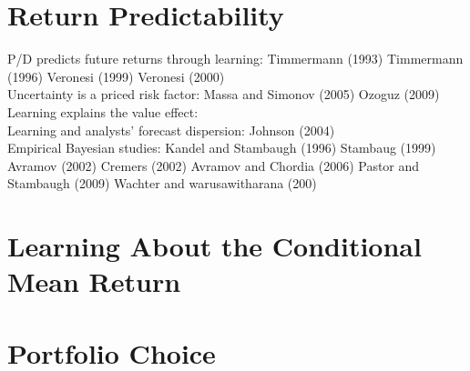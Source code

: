 \documentclass{article}
\begin{document}
\section{Return Predictability}
P/D predicts future returns through learning:
Timmermann (1993)
Timmermann (1996)
Veronesi (1999)
Veronesi (2000)
\\

Uncertainty is a priced risk factor:
Massa and Simonov (2005)
Ozoguz (2009)
\\

Learning explains the value effect: \cite{croce_investor_2015}
\\

Learning and analysts' forecast dispersion:
Johnson (2004)
\\

Empirical Bayesian studies:
Kandel and Stambaugh (1996)
Stambaug (1999)
Avramov (2002)
Cremers (2002)
Avramov and Chordia (2006)
Pastor and Stambaugh (2009)
Wachter and warusawitharana (200)

\section{Learning About the Conditional Mean Return}
\section{Portfolio Choice}
\newpage


\end{document}
